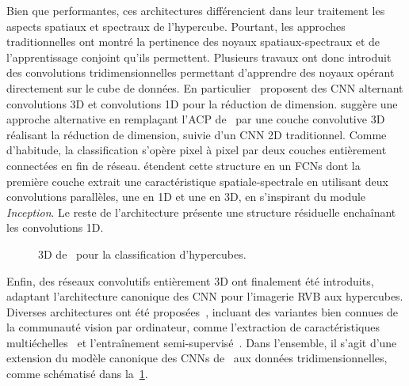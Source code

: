 Bien que performantes, ces architectures différencient dans leur traitement les aspects spatiaux et spectraux de l'hypercube. Pourtant, les approches traditionnelles ont montré la pertinence des noyaux spatiaux-spectraux et de l'apprentissage conjoint qu'ils permettent. Plusieurs travaux ont donc introduit des convolutions tridimensionnelles permettant d'apprendre des noyaux opérant directement sur le cube de données. En particulier~\citet{ben_hamida_deep_2016,chen_deep_2016} proposent des \gls{CNN} alternant convolutions 3D et convolutions 1D pour la réduction de dimension. \citet{luo_hsi-cnn_2018} suggère une approche alternative en remplaçant l'\gls{ACP} de~\citet{makantasis_deep_2015} par une couche convolutive 3D réalisant la réduction de dimension, suivie d'un \gls{CNN} 2D traditionnel. Comme d'habitude, la classification s'opère pixel à pixel par deux couches entièrement connectées en fin de réseau. \citet{lee_contextual_2016} étendent cette structure en un \glspl{FCN} dont la première couche extrait une caractéristique spatiale-spectrale en utilisant deux convolutions parallèles, une en 1D et une en 3D, en s'inspirant du module \emph{Inception}. Le reste de l'architecture présente une structure résiduelle enchaînant les convolutions 1D.

\begin{figure}[h]
  \resizebox{\textwidth}{!}{}
  \caption[ 3D pour la classification d'hypercubes.]{ 3D de~\citet{chen_deep_2016} pour la classification d'hypercubes.}
  \label{fig:cnn3d_hsi}
\end{figure}

Enfin, des réseaux convolutifs entièrement 3D ont finalement été introduits, adaptant l'architecture canonique des \gls{CNN} pour l'imagerie \gls{RVB} aux hypercubes. Diverses architectures ont été proposées~\cite{li_spectralspatial_2017}, incluant des variantes bien connues de la communauté vision par ordinateur, comme l'extraction de caractéristiques multiéchelles~\cite{he_multi-scale_2017} et l'entraînement semi-supervisé~\cite{liu_semi-supervised_2017}. Dans l'ensemble, il s'agit d'une extension du modèle canonique des \glspl{CNN} de~\citet{lecun_gradient-based_1998} aux données tridimensionnelles, comme schématisé dans la~\cref{fig:cnn3d_hsi}.

